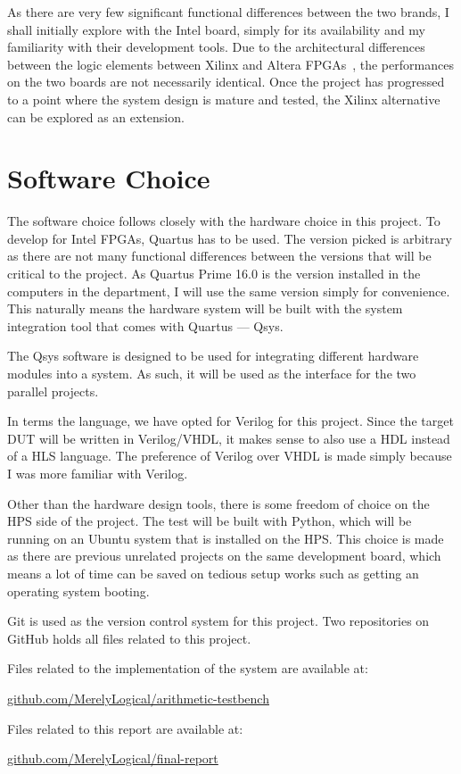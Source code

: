 As there are very few significant functional differences between the two brands, I shall initially explore with the Intel board, simply for its availability and my familiarity with their development tools.
Due to the architectural differences between the logic elements between Xilinx and Altera FPGAs~\cite{Scekic1}, the performances on the two boards are not necessarily identical.
Once the project has progressed to a point where the system design is mature and tested, the Xilinx alternative can be explored as an extension.

\section{Software Choice}
The software choice follows closely with the hardware choice in this project.
To develop for Intel FPGAs, Quartus has to be used.
The version picked is arbitrary as there are not many functional differences between the versions that will be critical to the project.
As Quartus Prime 16.0 is the version installed in the computers in the department, I will use the same version simply for convenience.
This naturally means the hardware system will be built with the system integration tool that comes with Quartus --- Qsys.

The Qsys software is designed to be used for integrating different hardware modules into a system.
As such, it will be used as the interface for the two parallel projects.

In terms the language, we have opted for Verilog for this project.
Since the target DUT will be written in Verilog/VHDL, it makes sense to also use a HDL instead of a HLS language.
The preference of Verilog over VHDL is made simply because I was more familiar with Verilog.

Other than the hardware design tools, there is some freedom of choice on the HPS side of the project.
The test will be built with Python, which will be running on an Ubuntu system that is installed on the HPS.
This choice is made as there are previous unrelated projects on the same development board, which means a lot of time can be saved on tedious setup works such as getting an operating system booting.

Git is used as the version control system for this project.
Two repositories on GitHub holds all files related to this project.

Files related to the implementation of the system are available at:

\indent\indent\url{github.com/MerelyLogical/arithmetic-testbench}

Files related to this report are available at:

\indent\indent\url{github.com/MerelyLogical/final-report}